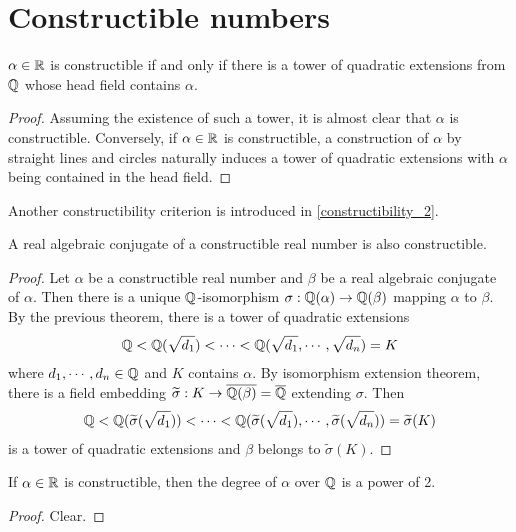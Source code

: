 \section{Constructible numbers}

\begin{thm}\label{constructibility_1}
    $\alpha\in{\mathbb{R}}$ is constructible if and only if there is a tower of quadratic extensions from ${\mathbb{Q}}$ whose head field contains $\alpha$.
\end{thm}
\begin{proof}
    Assuming the existence of such a tower, it is almost clear that $\alpha$ is constructible.
    Conversely, if $\alpha\in{\mathbb{R}}$ is constructible, a construction of $\alpha$ by straight lines and circles naturally induces a tower of quadratic extensions with $\alpha$ being contained in the head field.
\end{proof}
Another constructibility criterion is introduced in \cref{constructibility_2}.
\begin{cor}
    A real algebraic conjugate of a constructible real number is also constructible.
\end{cor}
\begin{proof}
    Let $\alpha$ be a constructible real number and $\beta$ be a real algebraic conjugate of $\alpha$.
    Then there is a unique ${\mathbb{Q}}$-isomorphism $\sigma: {\mathbb{Q}}(\alpha)\rightarrow{\mathbb{Q}}(\beta)$ mapping $\alpha$ to $\beta$.
    By the previous theorem, there is a tower of quadratic extensions
    \begin{align*}
        {\mathbb{Q}}<{\mathbb{Q}}(\sqrt{d_1})<\cdots<{\mathbb{Q}}(\sqrt{d_1}, \cdots, \sqrt{d_n})=K
    \end{align*}
    where $d_1, \cdots, d_n\in{\mathbb{Q}}$ and $K$ contains $\alpha$.
    By isomorphism extension theorem, there is a field embedding $\widetilde{\sigma}: K\rightarrow \overline{{\mathbb{Q}}(\beta)}=\overline{{\mathbb{Q}}}$ extending $\sigma$.
    Then
    \begin{align*}
        {\mathbb{Q}}<{\mathbb{Q}}(\widetilde{\sigma}(\sqrt{d_1}))<\cdots<{\mathbb{Q}}(\widetilde{\sigma}(\sqrt{d_1}), \cdots, \widetilde{\sigma}(\sqrt{d_n}))=\widetilde{\sigma}(K)
    \end{align*}
    is a tower of quadratic extensions and $\beta$ belongs to $\widetilde{\sigma}(K)$.
\end{proof}
\begin{cor}
    If $\alpha\in{\mathbb{R}}$ is constructible, then the degree of $\alpha$ over ${\mathbb{Q}}$ is a power of 2.
\end{cor}
\begin{proof}
    Clear.
\end{proof}